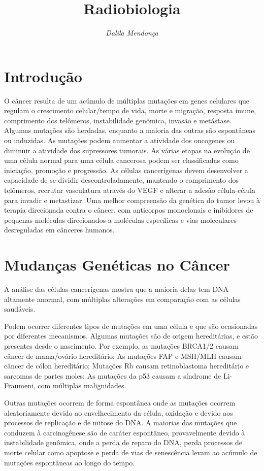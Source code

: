 \documentclass[11pt,a4paper]{article}
\title{\LobsterTwo\Huge{Radiobiologia}}
\author{\LobsterTwo{Carcinogênese\nocite{*}}}
\date{\LobsterTwo\textit{Dalila Mendonça}}
\newcounter{exemplo}
\begin{document}
	\maketitle


\section{Introdução}

    O câncer resulta de um acúmulo de múltiplas mutações em genes celulares que regulam o crescimento celular/tempo de vida, morte e migração, resposta imune, comprimento dos telômeros, instabilidade genômica, invasão e metástase. Algumas mutações são herdadas, enquanto a maioria das outras são espontâneas ou induzidas. As mutações podem aumentar a atividade dos oncogenes ou diminuir a atividade dos supressores tumorais. As várias etapas na evolução de uma célula normal para uma célula cancerosa podem ser classificadas como iniciação, promoção e progressão. As células cancerígenas devem desenvolver a capacidade de se dividir descontroladamente, mantendo o comprimento dos telômeros, recrutar vasculatura através do VEGF e alterar a adesão célula-célula para invadir e metastizar. Uma melhor compreensão da genética do tumor levou à terapia direcionada contra o câncer, com anticorpos monoclonais e inibidores de pequenas moléculas direcionados a moléculas específicas e vias moleculares desreguladas em cânceres humanos.

\section{Mudanças Genéticas no Câncer}

    A análise das células cancerígenas mostra que a maioria delas tem DNA altamente anormal, com múltiplas alterações em comparação com as células saudáveis. 
    
    Podem ocorrer diferentes tipos de mutações em uma célula e que são ocasionadas por diferentes mecanismos. Algumas mutações são de origem hereditárias, e estão presentes desde o nascimento. Por exemplo, as mutações BRCA1/2 causam câncer de mama/ovário hereditário; As mutações FAP e MSH/MLH causam câncer de cólon hereditário; Mutações Rb causam retinoblastoma hereditário e sarcomas de partes moles; As mutações da p53 causam a síndrome de Li-Fraumeni, com múltiplas malignidades.
    
    Outras mutações ocorrem de forma espontânea onde as mutações ocorrem aleatoriamente devido ao envelhecimento da célula, oxidação e devido aos processos de replicação e de mitose do DNA. A maiorias das mutações que conduzem à carcinogênese são de caráter espontâneo, provavelmente devido à instabilidade genômica, onde a perda de reparo do DNA, perda processos de morte celular como apoptose e perda de vias de senescência levam ao acúmulo de mutações espontâneas ao longo do tempo.
\end{document}
